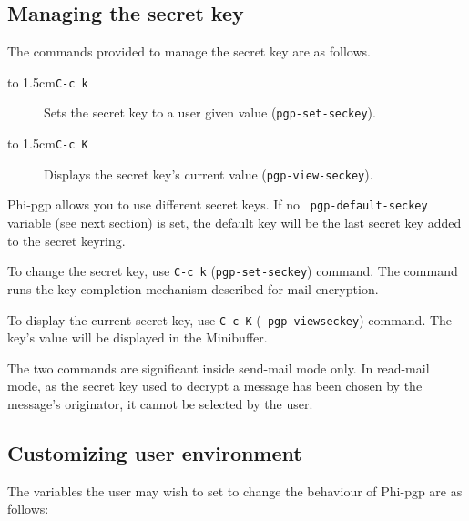 \subsection{Managing the secret key}

The commands provided  to manage the secret key are as follows.

{\leftmargini 2cm %
\begin{description}
\item[\hbox to 1.5cm{\tt C-c  k\hfill}]
Sets the secret key to a user given value ({\tt pgp-set-seckey}).

\item[\hbox to 1.5cm{\tt C-c  K\hfill}]
Displays the secret key's current value ({\tt pgp-view-seckey}).
\end{description}}

Phi-pgp  allows   you to  use  different  secret  keys.   If  no  {\tt
pgp-default-seckey} variable (see   next section) is set, the  default
key will be the last secret key added to the secret keyring.

To  change the  secret key,  use {\tt  C-c  k} ({\tt  pgp-set-seckey})
command. The  command runs the key  completion mechanism described for
mail encryption.

To display the current  secret key, use   {\tt C-c  K} ({\tt
pgp-view\-seckey}) command.  The   key's value will  be displayed  in the
Minibuffer.

The  two   commands are significant   inside send-mail  mode only.  In
read-mail mode, as the secret  key used to decrypt  a message has been
chosen by the message's originator, it cannot be selected by the user.

\subsection{Customizing user environment}

The variables the  user may  wish to  set to  change the behaviour  of
Phi-pgp are as follows:

